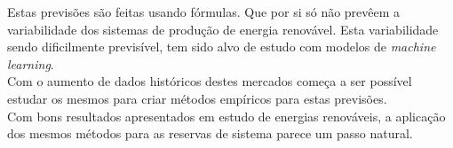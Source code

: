 Estas previsões são feitas usando fórmulas. Que por si só não prevêem a variabilidade dos sistemas de produção de energia renovável. Esta variabilidade sendo dificilmente previsível, tem sido alvo de estudo com modelos de \textit{machine learning}.\\
Com o aumento de dados históricos destes mercados começa a ser possível estudar os mesmos para criar métodos empíricos para estas previsões.\\
Com bons resultados apresentados em estudo de energias renováveis, a aplicação dos mesmos métodos para as reservas de sistema parece um passo natural. \\





